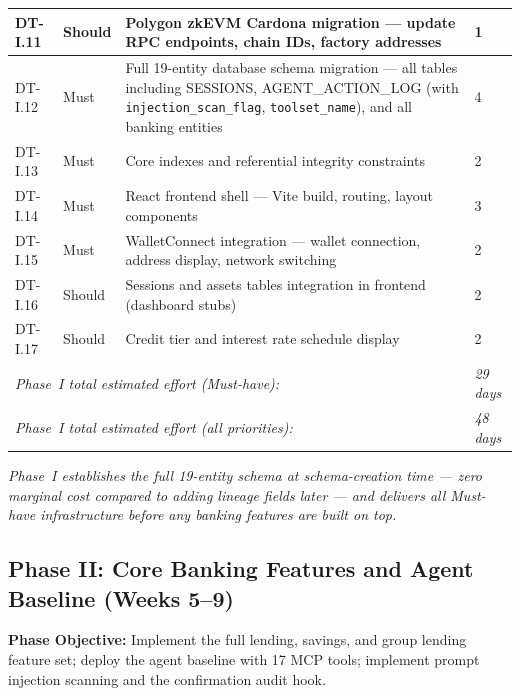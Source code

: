 \documentclass[12pt,a4paper]{report}
\begin{document}
\begin{table}[H]
\begin{tabular}{p{1.8cm}p{1.8cm}p{7.5cm}p{1.5cm}}
DT-I.11 & Should & Polygon zkEVM Cardona migration --- update RPC endpoints, chain IDs, factory addresses & 1 \\
\hline
DT-I.12 & Must & Full 19-entity database schema migration --- all tables including SESSIONS, AGENT\_ACTION\_LOG (with \texttt{injection\_scan\_flag}, \texttt{toolset\_name}), and all banking entities & 4 \\
DT-I.13 & Must & Core indexes and referential integrity constraints & 2 \\
\hline
DT-I.14 & Must & React frontend shell --- Vite build, routing, layout components & 3 \\
DT-I.15 & Must & WalletConnect integration --- wallet connection, address display, network switching & 2 \\
DT-I.16 & Should & Sessions and assets tables integration in frontend (dashboard stubs) & 2 \\
DT-I.17 & Should & Credit tier and interest rate schedule display & 2 \\
\hline
\multicolumn{3}{l}{\textit{Phase~I total estimated effort (Must-have):}} & \textit{29 days} \\
\multicolumn{3}{l}{\textit{Phase~I total estimated effort (all priorities):}} & \textit{48 days} \\
\hline
\end{tabular}
\end{table}


\vspace{2pt}
\noindent\textit{\small Phase~I establishes the full 19-entity schema at schema-creation time --- zero marginal cost compared to adding lineage fields later --- and delivers all Must-have infrastructure before any banking features are built on top.}

\subsection{Phase II: Core Banking Features and Agent Baseline (Weeks 5--9)}

\textbf{Phase Objective:} Implement the full lending, savings, and group lending
feature set; deploy the agent baseline with 17 MCP tools; implement prompt
injection scanning and the confirmation audit hook.
\end{document}
